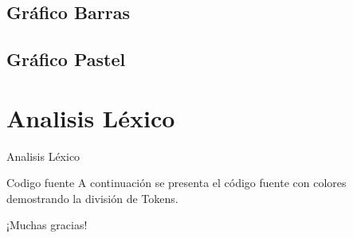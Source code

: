 \documentclass[10pt,xcolor={dvipsnames}]{beamer}
\begin{document}
    \subsection{Gráfico Barras}
        
    \subsection{Gráfico Pastel}
        

    \section{Analisis Léxico}
        \begin{frame}{Analisis Léxico}
        \begin{alertblock}{Codigo fuente}
            A continuación se presenta el código fuente con colores demostrando la división de Tokens.
            \end{alertblock}
        \end{frame}

        


    {
        \begin{frame}[standout]
            \begin{center}
              ¡Muchas gracias!
            \end{center}
        \end{frame}
    }
\end{document}
